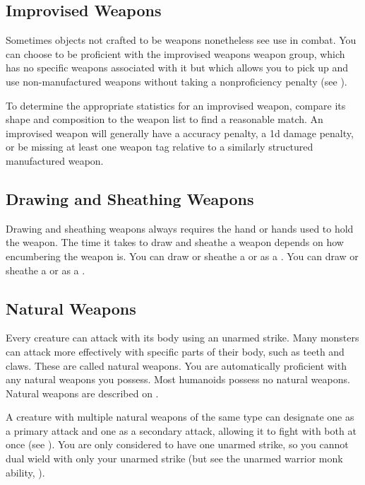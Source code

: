     \subsection{Improvised Weapons}\label{Improvised Weapons}
        Sometimes objects not crafted to be weapons nonetheless see use in combat.
        You can choose to be proficient with the improvised weapons weapon group, which has no specific weapons associated with it but which allows you to pick up and use non-manufactured weapons without taking a nonproficiency penalty (see ).

        To determine the appropriate statistics for an improvised weapon, compare its shape and composition to the weapon list to find a reasonable match.
        An improvised weapon will generally have a  accuracy penalty, a \minus1d damage penalty, or be missing at least one weapon tag relative to a similarly structured manufactured weapon.

    \subsection{Drawing and Sheathing Weapons}\label{Drawing and Sheathing Weapons}
        Drawing and sheathing weapons always requires the hand or hands used to hold the weapon.
        The time it takes to draw and sheathe a weapon depends on how encumbering the weapon is.
        You can draw or sheathe a  or  as a .
        You can draw or sheathe a  or  as a .

    \subsection{Natural Weapons}\label{Natural Weapons}
        Every creature can attack with its body using an unarmed strike. Many monsters can attack more effectively with specific parts of their body, such as teeth and claws. These are called natural weapons. You are automatically proficient with any natural weapons you possess. Most humanoids possess no natural weapons. Natural weapons are described on .

        A creature with multiple natural weapons of the same type can designate one as a primary attack and one as a secondary attack, allowing it to fight with both at once (see ). You are only considered to have one unarmed strike, so you cannot dual wield with only your unarmed strike (but see the unarmed warrior monk ability, ).

